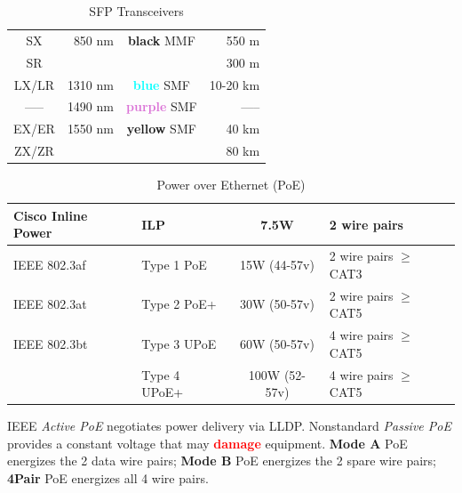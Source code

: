 \documentclass[12pt]{article}
\newcommand{\textcolorbf}[2]{\textcolor{#1} {\textbf{#2}}}
\begin{document}
	\begin{table}[H]
	\centering
	\caption{SFP Transceivers \label{tab:SFP}}
	\begin{tabular}{| c | r | c | r |}
	\hline
	SX		& 850 nm		& \textbf{black} MMF				& 550 m\\
	SR		&			&							& 300 m\\\hline
	LX/LR		& 1310 nm		& \textcolorbf{Cyan}{blue} SMF		& 10-20 km\\\hline
	----- 		& 1490 nm		& \textcolorbf{Orchid}{purple} SMF 		& -----\\\hline
	EX/ER 	& 1550 nm		& \textcolorbf{Dandelion}{yellow} SMF 	& 40 km\\
	ZX/ZR	&			&							& 80 km\\\hline
	\end{tabular}\end{table}

	\begin{table}[H]
	\centering
	\caption{Power over Ethernet (PoE) \label{tab:POE}}
	\begin{tabular}{| l  l | c | l |}
	\hline
	Cisco Inline Power	& ILP			& 7.5W			& 2 wire pairs\\\hline
	IEEE 802.3af			& Type 1 PoE	& 15W (44-57v)		& 2 wire pairs $\ge$ CAT3\\\hline
	IEEE 802.3at			& Type 2 PoE+	& 30W (50-57v)		& 2 wire pairs $\ge$ CAT5\\\hline
	IEEE 802.3bt 		& Type 3 UPoE	& 60W (50-57v) 		& 4 wire pairs $\ge$ CAT5\\
					& Type 4 UPoE+	& 100W (52-57v)		& 4 wire pairs $\ge$ CAT5\\\hline
	\end{tabular}\end{table}
	IEEE \textit{Active PoE} negotiates power delivery via LLDP. Nonstandard \textit{Passive PoE} provides a constant voltage that may \textcolorbf{Red}{damage} equipment. \textbf{Mode A} PoE energizes the 2 data wire pairs; \textbf{Mode B} PoE energizes the 2 spare wire pairs; \textbf{4Pair} PoE energizes all 4 wire pairs.





\end{document}
